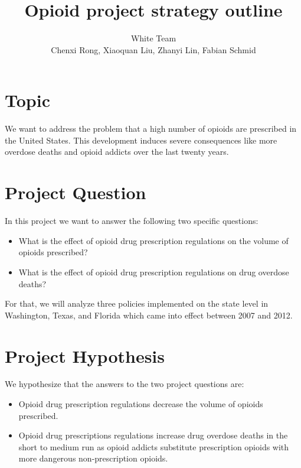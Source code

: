 \documentclass[12pt]{article}
\author{White Team \\ Chenxi Rong, Xiaoquan Liu, Zhanyi Lin, Fabian Schmid}
\title{Opioid project strategy outline}
\begin{document}
\maketitle

\section{Topic}


We want to address the problem that a high number of  opioids are prescribed in the United States. This development induces severe consequences like more overdose deaths and opioid addicts over the last twenty years.
\vspace*{0.5cm}

\section{Project Question}
In this project we want to answer the following two specific questions: 
\begin{itemize}
\item What is the effect of opioid drug prescription regulations on the volume of opioids prescribed?

\item What is the effect of opioid drug prescription regulations on drug overdose deaths?

\end{itemize}

For that, we will analyze three policies implemented on the state level in Washington, Texas, and Florida which came into effect between 2007 and 2012. 

\vspace*{0.5cm}
\section{Project Hypothesis}

We hypothesize that the answers to the two project questions are:
\begin{itemize}
\item Opioid drug prescription regulations decrease the volume of opioids prescribed.

\item Opioid drug prescriptions regulations increase drug overdose deaths in the short to medium run as opioid addicts substitute prescription opioids with more dangerous non-prescription opioids.
\end{itemize}
\end{document}
